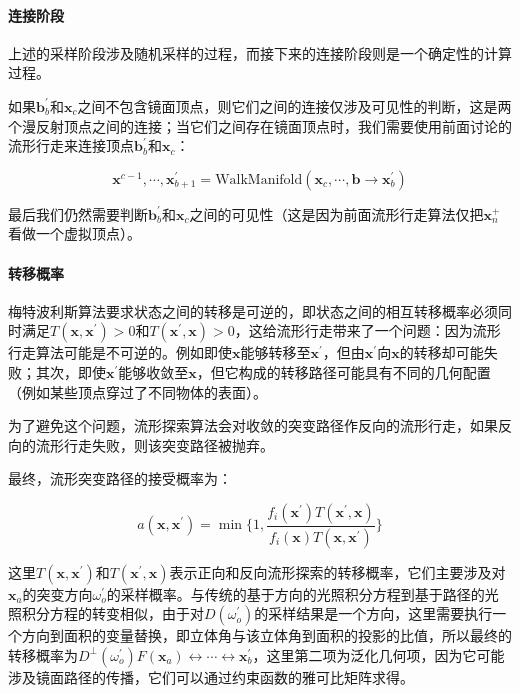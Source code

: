 \paragraph{连接阶段}
上述的采样阶段涉及随机采样的过程，而接下来的连接阶段则是一个确定性的计算过程。

如果$\mathbf{b}^{'}_b$和$\mathbf{x}_c$之间不包含镜面顶点，则它们之间的连接仅涉及可见性的判断，这是两个漫反射顶点之间的连接；当它们之间存在镜面顶点时，我们需要使用前面讨论的流形行走来连接顶点$\mathbf{b}^{'}_b$和$\mathbf{x}_c$：

\begin{equation}
	\mathbf{x}^{c-1},\cdots,\mathbf{x}^{'}_{b+1}=\text{WalkManifold}(\mathbf{x}_c,\cdots,\mathbf{b}\to\mathbf{x}^{'}_b)
\end{equation}

最后我们仍然需要判断$\mathbf{b}^{'}_b$和$\mathbf{x}_c$之间的可见性（这是因为前面流形行走算法仅把$\mathbf{x}^{+}_n$看做一个虚拟顶点）。



\paragraph{转移概率}
梅特波利斯算法要求状态之间的转移是可逆的，即状态之间的相互转移概率必须同时满足$T(\mathbf{x},\mathbf{x}^{'})>0$和$T(\mathbf{x}^{'},\mathbf{x})>0$，这给流形行走带来了一个问题：因为流形行走算法可能是不可逆的。例如即使$\mathbf{x}$能够转移至$\mathbf{x}^{'}$，但由$\mathbf{x}^{'}$向$\mathbf{x}$的转移却可能失败；其次，即使$\mathbf{x}^{'}$能够收敛至$\mathbf{x}$，但它构成的转移路径可能具有不同的几何配置（例如某些顶点穿过了不同物体的表面）。

为了避免这个问题，流形探索算法会对收敛的突变路径作反向的流形行走，如果反向的流形行走失败，则该突变路径被抛弃。

最终，流形突变路径的接受概率为：

\begin{equation}
	a({\mathbf{x}},{\mathbf{x}}^{'})=\min\bigg\{1,\frac{f_i({\mathbf{x}}^{'})T({\mathbf{x}}^{'},{\mathbf{x}})}{f_i({\mathbf{x}})T({\mathbf{x}},{\mathbf{x}}^{'})}\bigg\}
\end{equation}

\noindent 这里$T(\mathbf{x},\mathbf{x}^{'})$和$T(\mathbf{x}^{'},\mathbf{x})$表示正向和反向流形探索的转移概率，它们主要涉及对$\mathbf{x}_a$的突变方向$\omega^{'}_o$的采样概率。与传统的基于方向的光照积分方程到基于路径的光照积分方程的转变相似，由于对$D(\omega^{'}_o)$的采样结果是一个方向，这里需要执行一个方向到面积的变量替换，即立体角与该立体角到面积的投影的比值，所以最终的转移概率为$D^{\perp}(\omega^{'}_o)F(\mathbf{x}_a)\leftrightarrow\cdots\leftrightarrow\mathbf{x}^{'}_b$，这里第二项为泛化几何项，因为它可能涉及镜面路径的传播，它们可以通过约束函数的雅可比矩阵求得。






